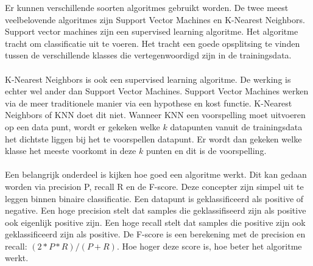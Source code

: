 \begin{samenvatting}
Er kunnen verschillende soorten algoritmes gebruikt worden. De twee meest veelbelovende algoritmes zijn Support Vector Machines en K-Nearest Neighbors.  Support vector machines zijn een supervised learning algoritme. Het algoritme tracht om classificatie uit te voeren. Het tracht een goede opsplitsing te vinden tussen de verschillende klasses die vertegenwoordigd zijn in de trainingsdata. \\
\\
K-Nearest Neighbors is ook een supervised learning algoritme. De werking is echter wel ander dan Support Vector Machines. Support Vector Machines werken via de meer traditionele manier via een hypothese en kost functie. K-Nearest Neighbors of KNN doet dit niet.  Wanneer KNN een voorspelling moet uitvoeren op een data punt, wordt er gekeken welke $k$ datapunten vanuit de trainingsdata het dichtste liggen bij het te voorspellen datapunt. Er wordt dan gekeken welke klasse het meeste voorkomt in deze $k$ punten en dit is de voorspelling. \\
\\
Een belangrijk onderdeel is kijken hoe goed een algoritme werkt. Dit kan gedaan worden via precision P, recall R en de F-score. Deze concepter zijn simpel uit te leggen binnen binaire classificatie. Een datapunt is geklassificeerd als positive of negative. Een hoge precision stelt dat samples die geklassifiseerd zijn als positive ook eigenlijk positive zijn. Een hoge recall stelt dat samples die positive zijn ook geklassificeerd zijn als positive. De F-score is een berekening met de precision en recall: $(2 * P * R) / ( P + R)$. Hoe hoger deze score is, hoe beter het algoritme werkt.


\end{samenvatting}

